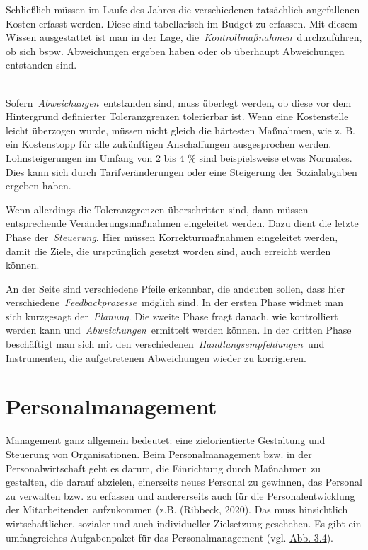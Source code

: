 \documentclass[
  letterpaper,
]{book}
\begin{document}
Schließlich müssen im Laufe des Jahres die verschiedenen tatsächlich
angefallenen Kosten erfasst werden. Diese sind tabellarisch im Budget zu
erfassen. Mit diesem Wissen ausgestattet ist man in der Lage,
die~\emph{Kontrollmaßnahmen}~durchzuführen, ob sich bspw. Abweichungen
ergeben haben oder ob überhaupt Abweichungen entstanden sind.\\
\strut \\
Sofern~\emph{Abweichungen}~entstanden sind, muss überlegt werden, ob
diese vor dem Hintergrund definierter Toleranzgrenzen tolerierbar ist.
Wenn eine Kostenstelle leicht überzogen wurde, müssen nicht gleich die
härtesten Maßnahmen, wie z. B. ein Kostenstopp für alle zukünftigen
Anschaffungen ausgesprochen werden. Lohnsteigerungen im Umfang von 2 bis
4 \% sind beispielsweise etwas Normales. Dies kann sich durch
Tarifveränderungen oder eine Steigerung der Sozialabgaben ergeben haben.

Wenn allerdings die Toleranzgrenzen überschritten sind, dann müssen
entsprechende Veränderungsmaßnahmen eingeleitet werden. Dazu dient die
letzte Phase der~\emph{Steuerung}. Hier müssen Korrekturmaßnahmen
eingeleitet werden, damit die Ziele, die ursprünglich gesetzt worden
sind, auch erreicht werden können.

An der Seite sind verschiedene Pfeile erkennbar, die andeuten sollen,
dass hier verschiedene~\emph{Feedbackprozesse}~möglich sind. In der
ersten Phase widmet man sich kurzgesagt der~\emph{Planung}. Die zweite
Phase fragt danach, wie kontrolliert werden kann
und~\emph{Abweichungen}~ermittelt werden können. In der dritten Phase
beschäftigt man sich mit den
verschiedenen~\emph{Handlungsempfehlungen}~und Instrumenten, die
aufgetretenen Abweichungen wieder zu korrigieren.

\section{Personalmanagement}\label{personalmanagement}

Management ganz allgemein bedeutet: eine zielorientierte Gestaltung und
Steuerung von Organisationen. Beim Personalmanagement bzw. in der
Personalwirtschaft geht es darum, die Einrichtung durch Maßnahmen zu
gestalten, die darauf abzielen, einerseits neues Personal zu gewinnen,
das Personal zu verwalten bzw. zu erfassen und andererseits auch für die
Personalentwicklung der Mitarbeitenden aufzukommen (z.B. (Ribbeck,
2020). Das muss hinsichtlich wirtschaftlicher, sozialer und auch
individueller Zielsetzung geschehen. Es gibt ein umfangreiches
Aufgabenpaket für das Personalmanagement (vgl. \hyperref[figure34]{Abb.
3.4}).
\end{document}
